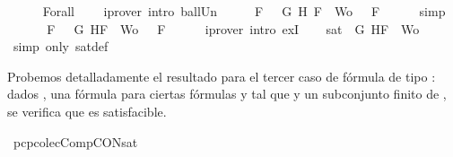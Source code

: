 \begin{isabellebody}
\ \ \ \ \isamarkupfalse%
\ Forall{}\ {}\ {}\ \isamarkupfalse%
\ {\isacharparenleft}iprover\ intro{\isacharcolon}\ ball{\isacharunderscore}Un{\isacharparenright}\isanewline
\ \ \isamarkupfalse%
\ \isamarkupfalse%
\ {\isachardoublequoteopen}{\isasymforall}F\ {\isasymin}\ {\isacharparenleft}{\isacharbraceleft}\isactrlbold {\isasymnot}\ G{\isacharcomma}\isactrlbold {\isasymnot}\ H{\isacharcomma}\ F{\isacharbraceright}\ {\isasymunion}\ Wo{\isacharparenright}{\isachardot}\ {\isasymA}\ {\isasymTurnstile}\ F{\isachardoublequoteclose}\isanewline
\ \ \ \ \isamarkupfalse%
\ simp\isanewline
\ \ \isamarkupfalse%
\ \isamarkupfalse%
\ {\isachardoublequoteopen}{\isasymexists}{\isasymA}{\isachardot}\ {\isasymforall}F\ {\isasymin}\ {\isacharparenleft}{\isacharbraceleft}\isactrlbold {\isasymnot}\ G{\isacharcomma}\isactrlbold {\isasymnot}\ H{\isacharcomma}F{\isacharbraceright}\ {\isasymunion}\ Wo{\isacharparenright}{\isachardot}\ {\isasymA}\ {\isasymTurnstile}\ F{\isachardoublequoteclose}\isanewline
\ \ \ \ \isamarkupfalse%
\ {\isacharparenleft}iprover\ intro{\isacharcolon}\ exI{\isacharparenright}\isanewline
\ \ \isamarkupfalse%
\ {\isachardoublequoteopen}sat\ {\isacharparenleft}{\isacharbraceleft}\isactrlbold {\isasymnot}\ G{\isacharcomma}\isactrlbold {\isasymnot}\ H{\isacharcomma}F{\isacharbraceright}\ {\isasymunion}\ Wo{\isacharparenright}{\isachardoublequoteclose}\isanewline
\ \ \ \ \isamarkupfalse%
\ {\isacharparenleft}simp\ only{\isacharcolon}\ sat{\isacharunderscore}def{\isacharparenright}\isanewline
{}\isamarkupfalse%
%
\endisatagproof
{\isafoldproof}%
%
\isadelimproof
%
\endisadelimproof
%
\begin{isamarkuptext}%
Probemos detalladamente el resultado para el tercer caso de fórmula de tipo \isa{{\isasymalpha}}: dados 
  , una fórmula  para ciertas fórmulas  y  tal que  y  un 
  subconjunto finito de , se verifica que  es satisfacible.%
\end{isamarkuptext}\isamarkuptrue%
\isamarkupfalse%
\ pcp{\isacharunderscore}colecComp{\isacharunderscore}CON{\isacharunderscore}sat{}{\isacharcolon}\isanewline

\end{isabellebody}
